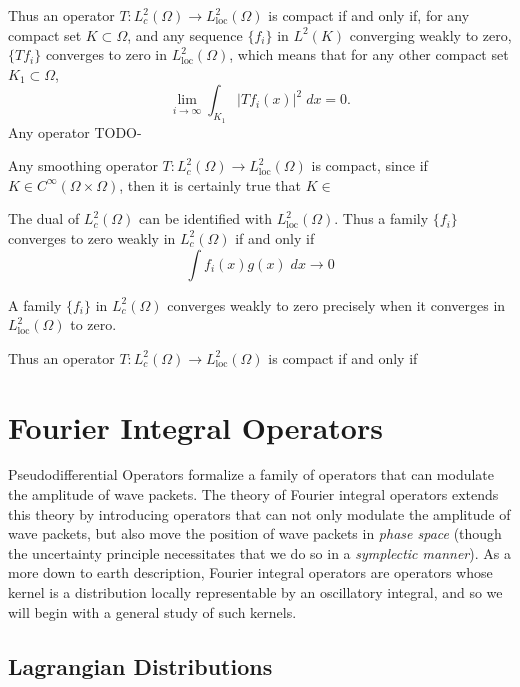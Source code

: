 Thus an operator $T: L^2_c(\Omega) \to L^2_{\text{loc}}(\Omega)$ is compact if and only if, for any compact set $K \subset \Omega$, and any sequence $\{ f_i \}$ in $L^2(K)$ converging weakly to zero, $\{ Tf_i \}$ converges to zero in $L^2_{\text{loc}}(\Omega)$, which means that for any other compact set $K_1 \subset \Omega$,
%
\[ \lim_{i \to \infty} \int_{K_1} |Tf_i(x)|^2\; dx = 0. \]
%
Any operator TODO-

Any smoothing operator $T: L^2_c(\Omega) \to L^2_{\text{loc}}(\Omega)$ is compact, since if $K \in C^\infty(\Omega \times \Omega)$, then it is certainly true that $K \in $

The dual of $L^2_c(\Omega)$ can be identified with $L^2_{\text{loc}}(\Omega)$. Thus a family $\{ f_i \}$ converges to zero weakly in $L^2_c(\Omega)$ if and only if
%
\[ \int f_i(x) g(x)\; dx \to 0 \]

A family $\{ f_i \}$ in $L^2_c(\Omega)$ converges weakly to zero precisely when it converges in $L^2_{\text{loc}}(\Omega)$ to zero.

Thus an operator $T: L^2_c(\Omega) \to L^2_{\text{loc}}(\Omega)$ is compact if and only if 









\chapter{Fourier Integral Operators}

Pseudodifferential Operators formalize a family of operators that can modulate the amplitude of wave packets. The theory of Fourier integral operators extends this theory by introducing operators that can not only modulate the amplitude of wave packets, but also move the position of wave packets in \emph{phase space} (though the uncertainty principle necessitates that we do so in a \emph{symplectic manner}). As a more down to earth description, Fourier integral operators are operators whose kernel is a distribution locally representable by an oscillatory integral, and so we will begin with a general study of such kernels.


\section{Lagrangian Distributions}

